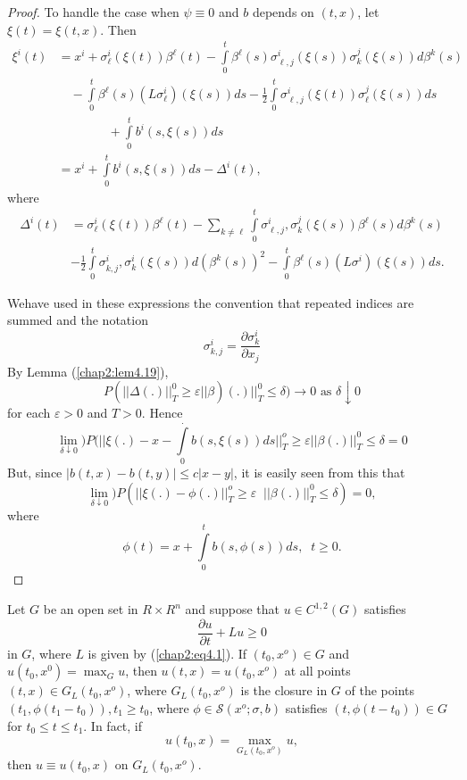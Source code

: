 \begin{proof}
To handle the case when $\psi \equiv 0$ and $b$ depends on $(t,x)$,
let $\xi(t) =\xi(t,x)$. Then  
\begin{align*}
\xi^i (t) & = x^i + \sigma^i_\ell (\xi(t)) \beta^\ell
(t)-\int\limits_{0}^t  \beta^\ell(s) \sigma^i_{\ell, j}(\xi(s))
\sigma^j_k (\xi(s))d \beta^k(s) \\ 
& \quad - \int \limits^t_0 \beta^\ell(s) (L \sigma^i_\ell)(\xi(s)) ds
- \frac{1}{2} \int\limits_{0}^t \sigma^i_{\ell,j}(\xi(t))
\sigma^j_\ell(\xi(s)) ds \\ 
& \qquad \qquad + \int\limits_{0}^t b^i(s, \xi(s)) ds \\ 
& = x^i + \int\limits_{0}^{t} b^i (s,\xi(s)) ds - \Delta^i(t), 
\end{align*}
where
\begin{align*}
\Delta^i (t) &= \sigma_\ell^i(\xi(t)) \beta^\ell (t)- \sum_{k \neq
  \ell} \int\limits_{0}^t \sigma_{\ell,j}^i, \sigma^j_k(\xi(s))
\beta^\ell(s) d \beta^k (s)\\ 
&- \frac{1}{2} \int\limits_{0}^t \sigma_{k,j}^i, \sigma^i_k(\xi(s))
d (\beta^k (s))^2- \int\limits_{0}^t \beta^\ell(s) (L
\sigma^i) (\xi(s)) ds.   
\end{align*}

We\pageoriginale have used in these expressions the convention that
repeated indices are summed and the notation  
$$
\sigma_{k,j}^i = \frac{\partial \sigma_k^i}{\partial x_j} 
$$
By Lemma (\ref{chap2:lem4.19}), 
$$
P( || \Delta(.) ||^0_T \ge \varepsilon || \beta)(.) ||^0_T \le
\delta) \to 0 \text{ as } \delta \downarrow 0 
$$ 
for each $\varepsilon > 0$ and $T >0$. Hence 
$$
\lim\limits_{\delta \downarrow 0} )P(|| \xi(.) - x-
\int\limits_{0}^. b(s, \xi(s))  ds ||^o_T \ge \varepsilon || \beta(.)
||^0_T \le \delta =0 
$$
But, since $| b (t,x) -b(t,y)| \le c|x-y|$, it is easily seen from
this that  
$$ 
\lim\limits_{\delta \downarrow 0} )P(|| \xi(.) - \phi(.) ||^o_T \ge
\varepsilon \;\; ||\beta(.) ||^0_T \le \delta) =0, 
$$
where
$$
\phi(t) = x+ \int\limits_{0}^t b(s, \phi(s)) ds, \;\; t \ge 0. 
$$
\end{proof}

\setcounter{coro}{20}
\begin{coro} %
Let $G$ be an open set in $R \times R^n$ and suppose that $u \in
C^{1,2}(G)$ satisfies 
$$
\frac{\partial u}{\partial t} + Lu \ge 0
$$
in $G$, where $L$ is given by (\ref{chap2:eq4.1}). If $(t_0, x^o) \in G$ and $u
(t_0, x^0) = \max_{G} u$, then $u(t,x) =u (t_0, x^o)$ at all points
$(t,x) \in G_L (t_0, x^o)$, where $G_L(t_0,x^o)$ is the closure in $G$
of the points $(t_1,   \phi(t_1-t_0)), t_1 \ge t_0$, where $\phi \in
\mathscr{S}(x^o; \sigma, b)$ satisfies $(t, \phi(t- t_0)) \in G$ for $t_0 \le t
\le t_1$. In fact, if   
$$
u(t_0, x)= \max_{G_L(t_0,x^o)} u,
$$\pageoriginale
then $u \equiv u(t_0,x)$ on $G_L(t_0, x^o)$.
\end{coro}

